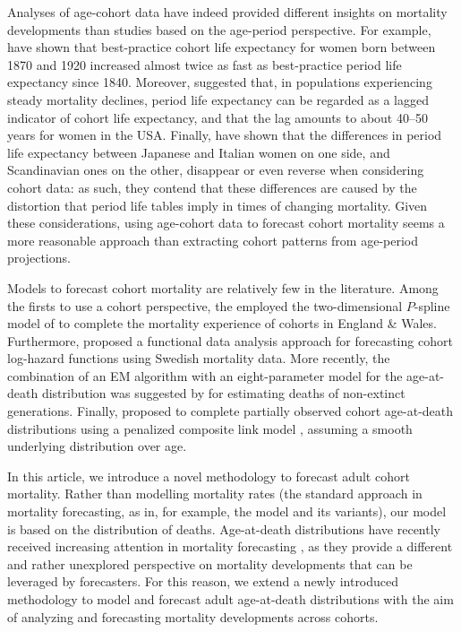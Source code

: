 \documentclass[11pt, a4paper]{article}
\begin{document}

{\color{red}Analyses of age-cohort data have indeed provided different insights on mortality developments than studies based on the age-period perspective. For example, \cite{shkolnikov2011steep} have shown that best-practice cohort life expectancy for women born between 1870 and 1920 increased almost twice as fast as best-practice period life expectancy since 1840. Moreover, \cite{goldstein2006relationships} suggested that, in populations experiencing steady mortality declines, period life expectancy can be regarded as a lagged indicator of cohort life expectancy, and that the lag amounts to about 40--50 years for women in the USA. Finally, \cite{borgan2019cohort} have shown that the differences in period life expectancy between Japanese and Italian women on one side, and Scandinavian ones on the other, disappear or even reverse when considering cohort data: as such, they contend that these differences are caused by the distortion that period life tables imply in times of changing mortality. Given these considerations, using age-cohort data to forecast cohort mortality seems a more reasonable approach than extracting cohort patterns from age-period projections. \par}

Models to forecast cohort mortality are relatively few in the literature. Among the firsts to use a cohort perspective, the \cite{cmi2007stochastic} employed the two-dimensional $P$-spline model of \cite{currie2004smoothing} to complete the mortality experience of cohorts in England \& Wales. Furthermore, \cite{chiou2009modeling} proposed a functional data analysis approach for forecasting cohort log-hazard functions using Swedish mortality data. More recently, the combination of an EM algorithm with an eight-parameter model for the age-at-death distribution was suggested by \cite{zanotto2017reconstruction} for estimating 
deaths of non-extinct generations. Finally, \cite{rizzi2019forecasting} proposed to complete partially observed cohort age-at-death distributions using a penalized composite link model \citep{eilers2007ill}, assuming a smooth underlying distribution over age. 

In this article, we introduce a novel methodology to forecast adult cohort mortality. Rather than modelling mortality rates (the standard approach in mortality forecasting, as in, for example, the \citeauthor{lee1992modeling} model and its variants), our model is based on the distribution of deaths. Age-at-death distributions have recently received increasing attention in mortality forecasting \citep{oeppen2008coherent,bergeron2017coherent,basellini2019three,basellini2019modelling,pascariu2019maximum}, as they provide a different and rather unexplored perspective on mortality developments that can be leveraged by forecasters. For this reason, we extend a newly introduced methodology to model and forecast adult age-at-death distributions \citep{basellini2019modelling} with the aim of analyzing and forecasting mortality developments across cohorts. 
 
\end{document}
